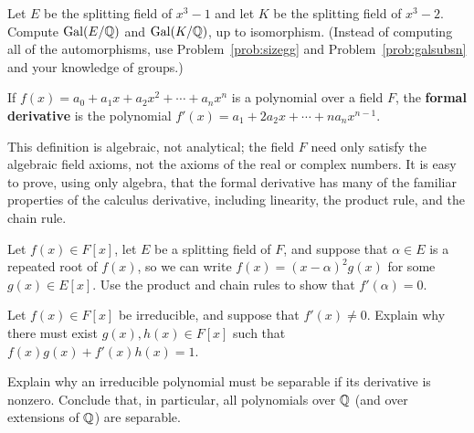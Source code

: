 \begin{problem}
    Let $E$ be the splitting field of $x^3-1$ and let $K$ be the splitting field of $x^3-2$. Compute $\operatorname{Gal}(E/\mathbb{Q})$ and $\operatorname{Gal}(K/\mathbb{Q})$, up to isomorphism. (Instead of computing all of the automorphisms, use Problem~\ref{prob:sizegg} and Problem~\ref{prob:galsubsn} and your knowledge of groups.)
\end{problem}

\begin{definition}\label{def:formderiv}
    If $f(x) = a_0 + a_1 x + a_2 x^2 + \cdots + a_n x^n$ is a polynomial over a field $F$, the \textbf{formal derivative} is the polynomial $f'(x) = a_1 + 2 a_2 x + \cdots + n a_{n} x^{n-1}$.
\begin{annotation}
\end{annotation}
\end{definition}

This definition is algebraic, not analytical; the field $F$ need only satisfy the algebraic field axioms, not the axioms of the real or complex numbers. It is easy to prove, using only algebra, that the formal derivative has many of the familiar properties of the calculus derivative, including linearity, the product rule, and the chain rule.

\begin{problem}\label{prob:formderiv}
Let $f(x) \in F[x]$, let $E$ be a splitting field of $F$, and suppose that $\alpha\in E$ is a repeated root of $f(x)$, so we can write $f(x) = (x-\alpha)^2g(x)$ for some $g(x) \in E[x]$.  Use the product and chain rules to show that $f'(\alpha) = 0$.
\end{problem}

\begin{problem}
  Let $f(x) \in F[x]$ be irreducible, and suppose that $f'(x) \neq 0$. Explain why there must exist $g(x), h(x) \in F[x]$ such that $f(x)g(x) + f'(x)h(x) = 1$.
\end{problem}

\begin{problem}\label{prob:qperfect}
    Explain why an irreducible polynomial must be separable if its derivative is nonzero. Conclude that, in particular, all polynomials over $\mathbb{Q}$ (and over extensions of $\mathbb{Q}$) are separable.
\begin{annotation}
\end{annotation}
\end{problem}

